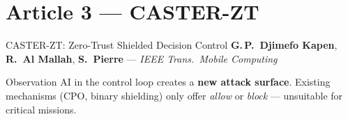 \documentclass[10pt,aspectratio=169]{beamer}
\begin{document}
\section{Article 3 --- CASTER-ZT}

\begin{frame}[shrink=5]{CASTER-ZT: Zero-Trust Shielded Decision Control}
{\small\color{polyblue} \textbf{G.\,P.\ Djimefo Kapen}, \textbf{R.\ Al Mallah}, \textbf{S.\ Pierre} --- \textit{IEEE Trans.\ Mobile Computing}}
\vspace{1pt}
\begin{block}{Observation}
  AI in the control loop creates a \textbf{new attack surface}. Existing mechanisms (CPO, binary shielding) only offer \emph{allow} or \emph{block} --- unsuitable for critical missions.
\end{block}


\end{frame}
\end{document}
